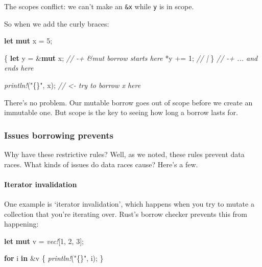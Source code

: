 \documentclass[a4paper,]{book}
\newenvironment{Shaded}{\begin{snugshade}}{\end{snugshade}}
\newcommand{\KeywordTok}[1]{\textcolor[rgb]{0.13,0.29,0.53}{\textbf{{#1}}}}
\newcommand{\DecValTok}[1]{\textcolor[rgb]{0.00,0.00,0.81}{{#1}}}
\newcommand{\StringTok}[1]{\textcolor[rgb]{0.31,0.60,0.02}{{#1}}}
\newcommand{\CommentTok}[1]{\textcolor[rgb]{0.56,0.35,0.01}{\textit{{#1}}}}
\newcommand{\PreprocessorTok}[1]{\textcolor[rgb]{0.56,0.35,0.01}{\textit{{#1}}}}
\newcommand{\NormalTok}[1]{{#1}}
\let\oldparagraph\paragraph
\renewcommand{\paragraph}[1]{\oldparagraph{#1}\mbox{}}
\begin{document}
The scopes conflict: we can't make an \texttt{\&x} while \texttt{y} is
in scope.

So when we add the curly braces:

\begin{Shaded}
\begin{Highlighting}[]
\KeywordTok{let} \KeywordTok{mut} \NormalTok{x = }\DecValTok{5}\NormalTok{;}

\NormalTok{\{                   }
    \KeywordTok{let} \NormalTok{y = &}\KeywordTok{mut} \NormalTok{x; }\CommentTok{// -+ &mut borrow starts here}
    \NormalTok{*y += }\DecValTok{1}\NormalTok{;        }\CommentTok{//  |}
\NormalTok{\}                   }\CommentTok{// -+ ... and ends here}

\PreprocessorTok{println!}\NormalTok{(}\StringTok{"\{\}"}\NormalTok{, x);  }\CommentTok{// <- try to borrow x here}
\end{Highlighting}
\end{Shaded}

There's no problem. Our mutable borrow goes out of scope before we
create an immutable one. But scope is the key to seeing how long a
borrow lasts for.

\subsubsection{Issues borrowing
prevents}\label{issues-borrowing-prevents}

Why have these restrictive rules? Well, as we noted, these rules prevent
data races. What kinds of issues do data races cause? Here's a few.

\paragraph{Iterator invalidation}\label{iterator-invalidation}

One example is `iterator invalidation', which happens when you try to
mutate a collection that you're iterating over. Rust's borrow checker
prevents this from happening:

\begin{Shaded}
\begin{Highlighting}[]
\KeywordTok{let} \KeywordTok{mut} \NormalTok{v = }\PreprocessorTok{vec!}\NormalTok{[}\DecValTok{1}\NormalTok{, }\DecValTok{2}\NormalTok{, }\DecValTok{3}\NormalTok{];}

\KeywordTok{for} \NormalTok{i }\KeywordTok{in} \NormalTok{&v \{}
    \PreprocessorTok{println!}\NormalTok{(}\StringTok{"\{\}"}\NormalTok{, i);}
\NormalTok{\}}
\end{Highlighting}
\end{Shaded}
\end{document}
